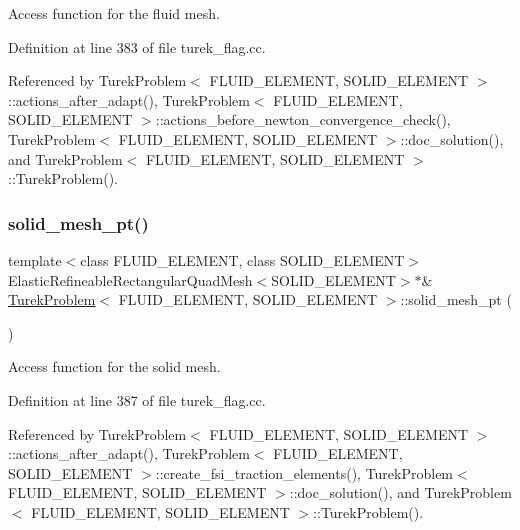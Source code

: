 Access function for the fluid mesh. 



Definition at line 383 of file turek\+\_\+flag.\+cc.



Referenced by Turek\+Problem$<$ F\+L\+U\+I\+D\+\_\+\+E\+L\+E\+M\+E\+N\+T, S\+O\+L\+I\+D\+\_\+\+E\+L\+E\+M\+E\+N\+T $>$\+::actions\+\_\+after\+\_\+adapt(), Turek\+Problem$<$ F\+L\+U\+I\+D\+\_\+\+E\+L\+E\+M\+E\+N\+T, S\+O\+L\+I\+D\+\_\+\+E\+L\+E\+M\+E\+N\+T $>$\+::actions\+\_\+before\+\_\+newton\+\_\+convergence\+\_\+check(), Turek\+Problem$<$ F\+L\+U\+I\+D\+\_\+\+E\+L\+E\+M\+E\+N\+T, S\+O\+L\+I\+D\+\_\+\+E\+L\+E\+M\+E\+N\+T $>$\+::doc\+\_\+solution(), and Turek\+Problem$<$ F\+L\+U\+I\+D\+\_\+\+E\+L\+E\+M\+E\+N\+T, S\+O\+L\+I\+D\+\_\+\+E\+L\+E\+M\+E\+N\+T $>$\+::\+Turek\+Problem().

\mbox{\label{classTurekProblem_a89430ae6d87a85a83e23e14e0b0d72b7}} 
\subsubsection{\texorpdfstring{solid\+\_\+mesh\+\_\+pt()}{solid\_mesh\_pt()}}
{\footnotesize\ttfamily template$<$class F\+L\+U\+I\+D\+\_\+\+E\+L\+E\+M\+E\+NT, class S\+O\+L\+I\+D\+\_\+\+E\+L\+E\+M\+E\+NT$>$ \\
Elastic\+Refineable\+Rectangular\+Quad\+Mesh$<$S\+O\+L\+I\+D\+\_\+\+E\+L\+E\+M\+E\+NT$>$$\ast$\& \hyperlink{classTurekProblem}{Turek\+Problem}$<$ F\+L\+U\+I\+D\+\_\+\+E\+L\+E\+M\+E\+NT, S\+O\+L\+I\+D\+\_\+\+E\+L\+E\+M\+E\+NT $>$\+::solid\+\_\+mesh\+\_\+pt (\begin{DoxyParamCaption}{ }\end{DoxyParamCaption})\hspace{0.3cm}{\ttfamily [inline]}}



Access function for the solid mesh. 



Definition at line 387 of file turek\+\_\+flag.\+cc.



Referenced by Turek\+Problem$<$ F\+L\+U\+I\+D\+\_\+\+E\+L\+E\+M\+E\+N\+T, S\+O\+L\+I\+D\+\_\+\+E\+L\+E\+M\+E\+N\+T $>$\+::actions\+\_\+after\+\_\+adapt(), Turek\+Problem$<$ F\+L\+U\+I\+D\+\_\+\+E\+L\+E\+M\+E\+N\+T, S\+O\+L\+I\+D\+\_\+\+E\+L\+E\+M\+E\+N\+T $>$\+::create\+\_\+fsi\+\_\+traction\+\_\+elements(), Turek\+Problem$<$ F\+L\+U\+I\+D\+\_\+\+E\+L\+E\+M\+E\+N\+T, S\+O\+L\+I\+D\+\_\+\+E\+L\+E\+M\+E\+N\+T $>$\+::doc\+\_\+solution(), and Turek\+Problem$<$ F\+L\+U\+I\+D\+\_\+\+E\+L\+E\+M\+E\+N\+T, S\+O\+L\+I\+D\+\_\+\+E\+L\+E\+M\+E\+N\+T $>$\+::\+Turek\+Problem().

